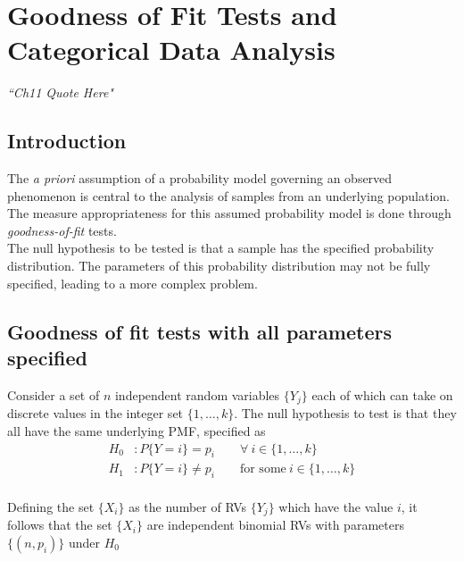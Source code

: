 \chapter{Goodness of Fit Tests and Categorical Data Analysis}


\begin{flushright}
	\textit{``Ch11 Quote Here"} \\
\end{flushright}

\section{Introduction}

The \textit{a priori} assumption of a probability model governing an observed phenomenon is central to the analysis of samples from an underlying population. The measure appropriateness for this assumed probability model is done through \textit{goodness-of-fit} tests.\\

The null hypothesis to be tested is that a sample has the specified probability distribution. The parameters of this probability distribution may not be fully specified, leading to a more complex problem. \\

\section{Goodness of fit tests with all parameters specified}

Consider a set of $ n $ independent random variables $ \{Y_j\} $ each of which can take on discrete values in the integer set $ \{1, \dots , k\} $. The null hypothesis to test is that they all have the same underlying PMF, specified as\\

\begin{align}
	H_0 &: P\{Y = i\} = p_i \qquad \forall \ i \in \{1, \dots , k\} \\
	H_1 &: P\{Y = i\} \neq p_i \qquad \text{for some}\  i \in \{1, \dots , k\} \nonumber
\end{align}\\

Defining the set $ \{X_i\} $ as the number of RVs $ \{Y_j\} $ which have the value $ i $, it follows that the set $ \{X_i\} $ are independent binomial RVs with parameters $ \{(n, p_i)\} $ under $ H_0 $\\

